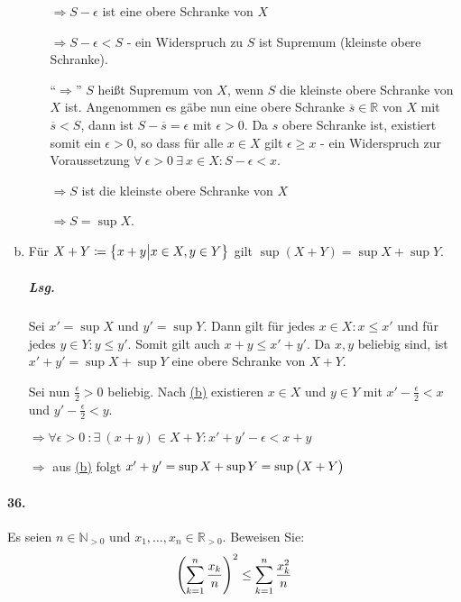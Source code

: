 \documentclass{scrreprt}
\begin{document}
\begin{enumerate}[(a)]
\begin{itemize}
    $\Rightarrow S - \epsilon$ ist eine obere Schranke von $X$

    $\Rightarrow S - \epsilon < S$ - ein Widerspruch zu $S$ ist Supremum
    (kleinste obere Schranke).

  \item[``$\Rightarrow$''] $S$ heißt Supremum von $X$, wenn $S$ die kleinste
    obere Schranke von $X$ ist.
    Angenommen es gäbe nun eine obere Schranke $\overline{s} \in \mathbb{R}$
    von $X$ mit $\overline{s} < S$, dann ist $S - \overline{s} = \epsilon$ mit
    $\epsilon > 0$.
    Da $s$ obere Schranke ist, existiert somit ein $\epsilon > 0$, so dass
    für alle $x \in X$ gilt $\epsilon \geq x$ - ein Widerspruch zur
    Voraussetzung
    $\forall \: \epsilon > 0 \: \exists \: x \in X \colon S - \epsilon < x$.

    $\Rightarrow S$ ist die kleinste obere Schranke von $X$

    $\Rightarrow S = \sup X$.
  \end{itemize}

\newpage
\item Für $X + Y \coloneqq \qty\big{ x + y {\big |} x \in X, y \in Y}$ gilt
  $\sup(X + Y) = \sup X + \sup Y$.

  \subparagraph{Lsg.} Sei $x' = \sup X$ und $y' = \sup Y$.
  Dann gilt für jedes $x \in X \colon x \leq x'$ und für jedes
  $y \in Y \colon y \leq y'$.
  Somit gilt auch $x + y \leq x' + y'$.
  Da $x, y$ beliebig sind, ist $x' + y' = \sup X + \sup Y$ eine obere Schranke
  von $X + Y$.

  Sei nun $\frac{\epsilon}{2} > 0$ beliebig.
  Nach \hyperref[sec:35_b]{(b)} existieren $x \in X$ und $y \in Y$ mit
  $x' - \frac{\epsilon}{2} < x$ und $y' - \frac{\epsilon}{2} < y$.

  $\Rightarrow \forall \epsilon > 0 \: \colon \exists \: (x + y) \in X + Y
  \colon x' + y' - \epsilon < x + y$

  $\Rightarrow$ aus \hyperref[sec:35_b]{(b)} folgt
  $x' + y' = \sup X + \sup Y = \sup \qty\big(X + Y)$
\end{enumerate}

\newpage
\paragraph{36.} Es seien $n \in \mathbb{N}_{> 0}$ und
$x_1, \ldots, x_n \in \mathbb{R}_{> 0}$.
Beweisen Sie:
\[
  \qty(\sum_{k = 1}^n \frac{x_k}{n})^2 \leq \sum_{k = 1}^n \frac{x_k^2}{n}
\]
\end{document}
